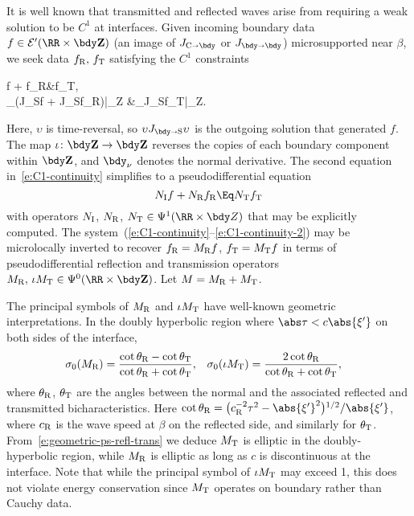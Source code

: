 \documentclass[10pt]{article}
\theoremstyle{plain}
\theoremstyle{definition}
\theoremstyle{remark}
\numberwithin{theorem}{section}
\numberwithin{example}{section}
\numberwithin{equation}{section}
\numberwithin{figure}{section}
\let\d\bdy 						%
\newcommand\JCB{J_{\text C\shortrightarrow \bdy}}		%
\newcommand\JBS{J_{\bdy\shortrightarrow \text S}}		%
\newcommand\JBB{J_{\bdy\shortrightarrow \bdy}}			%
\newcommand\subI{_{\text I}}						%
\newcommand\subR{_{\text R}}						%
\newcommand\subT{_{\text T}}						%
\newcommand\eqml{\Eq}					%
\begin{document}
It is well known that transmitted and reflected waves arise from requiring a weak solution to be $C^1$ at interfaces. Given incoming boundary data $f\in\mathcal E'(\RR\times\bdy\mathbf Z)$ (an image of $\JCB$ or $\JBB$) microsupported near $\beta$, we seek data $f\subR,\,f\subT$ satisfying the $C^1$ constraints
\begin{nalign}
	f + f\subR &\eqml \iota f\subT,\\
	\d_\nu (\upsilon\JBS\upsilon f + \JBS f\subR)\big|_{\RR\times\bdy\mathbf Z} &\eqml \iota \d_\nu\JBS f\subT\big|_{\RR\times\bdy\mathbf Z}.
	\label{e:C1-continuity}
\end{nalign}
Here, $\upsilon$ is time-reversal, so $\upsilon\JBS\upsilon$ is the outgoing solution that generated $f$. The map $\iota\colon\bdy\mathbf Z\to\bdy\mathbf Z$ reverses the copies of each boundary component within $\bdy\mathbf Z$, and $\d_\nu$ denotes the normal derivative. The second equation in~\eqref{e:C1-continuity} simplifies to a pseudodifferential equation
\begin{equation}
	N\subI f + N\subR f\subR \eqml N\subT f\subT
	\label{e:C1-continuity-2}
\end{equation}
with operators $N\subI$, $N\subR$, $N\subT\in\Psi^1(\RR\times\bdy Z)$ that may be explicitly computed. The system~(\ref{e:C1-continuity}--\ref{e:C1-continuity-2}) may be microlocally inverted to recover $f\subR=M\subR f$, $f\subT=M\subT f$ in terms of pseudodifferential reflection and transmission operators $M\subR,\,\iota M\subT\in\Psi^0(\RR\times\bdy\mathbf Z)$. Let $M=M\subR+M\subT$.

The principal symbols of $M\subR$ and $\iota M\subT$ have well-known geometric interpretations. In the doubly hyperbolic region where $\abs\tau<c\abs{\xi'}$ on both sides of the interface,
\begin{align}
	\sigma_0(M\subR) &= \frac{\cot\theta\subR-\cot\theta\subT}{\cot\theta\subR+\cot\theta\subT},
	&
	\sigma_0(\iota M\subT) &= \frac{2\cot\theta\subR}{\cot\theta\subR+\cot\theta\subT},
	\label{e:geometric-ps-refl-trans}
\end{align}
where $\theta\subR$, $\theta\subT$ are the angles between the normal and the associated reflected and transmitted bicharacteristics. Here $\cot\theta\subR=\big(c\subR^{-2}\tau^2-\abs{\xi'}^2\big){}^{1/2}/\abs{\xi'}$, where $c\subR$ is the wave speed at $\beta$ on the reflected side, and similarly for $\theta_{\textrm T}$. From~\eqref{e:geometric-ps-refl-trans} we deduce $M\subT$ is elliptic in the doubly-hyperbolic region, while $M\subR$ is elliptic as long as $c$ is discontinuous at the interface. Note that while the principal symbol of $\iota M\subT$ may exceed 1, this does not violate energy conservation since $M\subT$ operates on boundary rather than Cauchy data.
\end{document}
